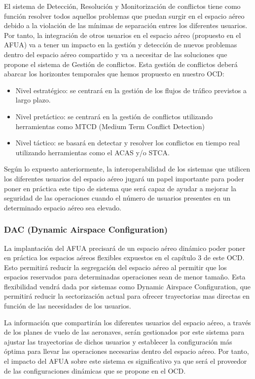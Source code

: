 El sistema de Detección, Resolución y Monitorización de conflictos tiene como función resolver todos aquellos problemas que puedan surgir en el espacio aéreo debido a la violación de las mínimas de separación entres los diferentes usuarios. Por tanto, la integración de otros usuarios en el espacio aéreo (propuesto en el AFUA) va a tener un impacto en la gestión y detección de nuevos problemas dentro del espacio aéreo compartido y va a necesitar de las soluciones que propone el sistema de Gestión de conflictos.  Esta gestión de conflictos deberá abarcar los horizontes temporales que hemos propuesto en nuestro OCD:

\begin{itemize}
    \item Nivel estratégico: se centrará en la gestión de los flujos de tráfico previstos a largo plazo.
    \item Nivel pretáctico: se centrará en la gestión de conflictos utilizando herramientas como MTCD (Medium Term Conflict Detection) 
    \item Nivel táctico: se basará en detectar y resolver los conflictos en tiempo real utilizando herramientas como el ACAS y/o STCA.
\end{itemize}

Según lo expuesto anteriormente, la interoperabilidad de los sistemas que utilicen los diferentes usuarios del espacio aéreo jugará un papel importante para poder poner en práctica este tipo de sistema que será capaz de ayudar a mejorar la seguridad de las operaciones cuando el número de usuarios presentes en un determinado espacio aéreo sea elevado.

\subsubsection{DAC (Dynamic Airspace Configuration)}

La implantación del AFUA precisará de un espacio aéreo dinámico poder poner en práctica los espacios aéreos flexibles expuestos en el capítulo 3 de este OCD. Esto permitirá reducir la segregación del espacio aéreo al permitir que los espacios reservados para determinadas operaciones sean de menor tamaño. Esta flexibilidad vendrá dada por sistemas como Dynamic Airspace Configuration, que permitirá reducir la sectorización actual para ofrecer trayectorias mas directas en función de las necesidades de los usuarios. 

La información que compartirán los diferentes usuarios del espacio aéreo, a través de los planes de vuelo de las aeronaves, serán gestionados por este sistema para ajustar las trayectorias de dichos usuarios y establecer la configuración más óptima para llevar las operaciones necesarias dentro del espacio aéreo.  Por tanto, el impacto del AFUA sobre este sistema es significativo ya que será el proveedor de las configuraciones dinámicas que se propone en el OCD.

